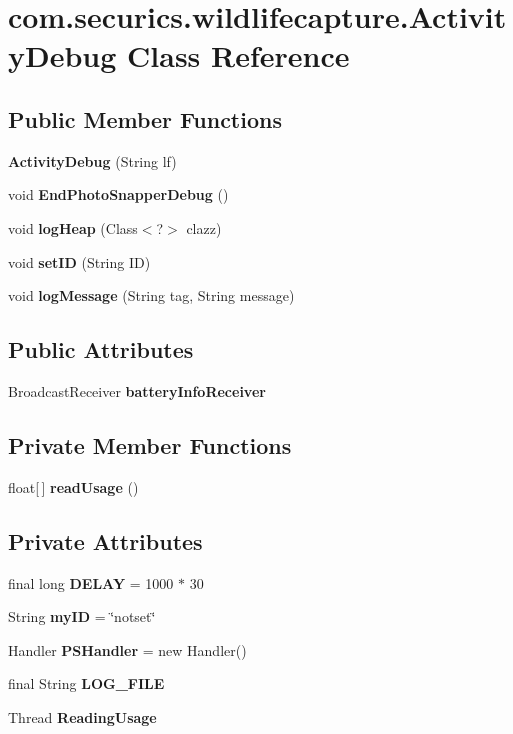 \section{com.\+securics.\+wildlifecapture.\+Activity\+Debug Class Reference}
\label{classcom_1_1securics_1_1wildlifecapture_1_1_activity_debug}
\subsection*{Public Member Functions}
\begin{DoxyCompactItemize}
\item 
{\bf Activity\+Debug} (String lf)
\item 
void {\bf End\+Photo\+Snapper\+Debug} ()
\item 
void {\bf log\+Heap} (Class$<$?$>$ clazz)
\item 
void {\bf set\+I\+D} (String I\+D)
\item 
void {\bf log\+Message} (String tag, String message)
\end{DoxyCompactItemize}
\subsection*{Public Attributes}
\begin{DoxyCompactItemize}
\item 
Broadcast\+Receiver {\bf battery\+Info\+Receiver}
\end{DoxyCompactItemize}
\subsection*{Private Member Functions}
\begin{DoxyCompactItemize}
\item 
float[$\,$] {\bf read\+Usage} ()
\end{DoxyCompactItemize}
\subsection*{Private Attributes}
\begin{DoxyCompactItemize}
\item 
final long {\bf D\+E\+L\+A\+Y} = 1000 $\ast$ 30
\item 
String {\bf my\+I\+D} = \char`\"{}notset\char`\"{}
\item 
Handler {\bf P\+S\+Handler} = new Handler()
\item 
final String {\bf L\+O\+G\+\_\+\+F\+I\+L\+E}
\item 
Thread {\bf Reading\+Usage}
\end{DoxyCompactItemize}
